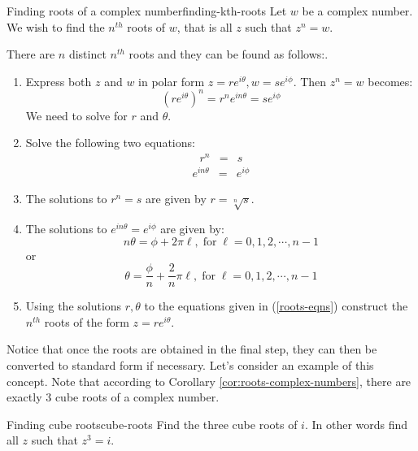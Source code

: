 \begin{procedure}{Finding roots of a complex number}{finding-kth-roots}
Let $w$ be a complex number. We wish to find the $n^{th}$ roots of $w$, that is all $z$ such that $z^n = w$. 

There are $n$ distinct $n^{th}$ roots and they can be found as follows:. 
 
\begin{enumerate}
\item Express both $z$ and $w$ in polar form $z=re^{i\theta}, w=se^{i\phi}$. Then $z^n = w$ becomes:
\[
(re^{i\theta})^n = r^n e^{i n \theta} = se^{i\phi}
\]
We need to solve for $r$ and $\theta$. 
\item Solve the following two equations:
\begin{eqnarray*}
r^n &=& s 
\end{eqnarray*}
\begin{eqnarray}
e^{i n \theta} &=& e^{i \phi}
\label{roots-eqns}
\end{eqnarray}
\item The solutions to $r^n = s$ are given by $r = \sqrt[n]{s}$. 

\item The solutions to $e^{i n \theta} = e^{i \phi}$ are given by:
\[
n\theta = \phi + 2\pi \ell,  \; \mbox{for} \; \ell = 0,1,2, \cdots, n-1
\]
or
\[
\theta = \frac{\phi}{n} + \frac{2}{n} \pi \ell, \; \mbox{for} \; \ell = 0,1,2, \cdots, n-1 
\]
\item
Using the solutions $r, \theta$ to the equations given in (\ref{roots-eqns})
construct the $n^{th}$ roots of the form $z = re^{i\theta}$.  
\end{enumerate}
\end{procedure}

Notice that once the roots are obtained in the final step, they can then be converted to standard form if necessary. Let's consider an example of this concept. Note that according to Corollary \ref{cor:roots-complex-numbers}, 
there are exactly $3$ cube roots of a complex number.

\begin{example}{Finding cube roots}{cube-roots}
Find the three cube roots of $i$. In other words find all $z$ such that $z^3 = i$. 
\end{example}

